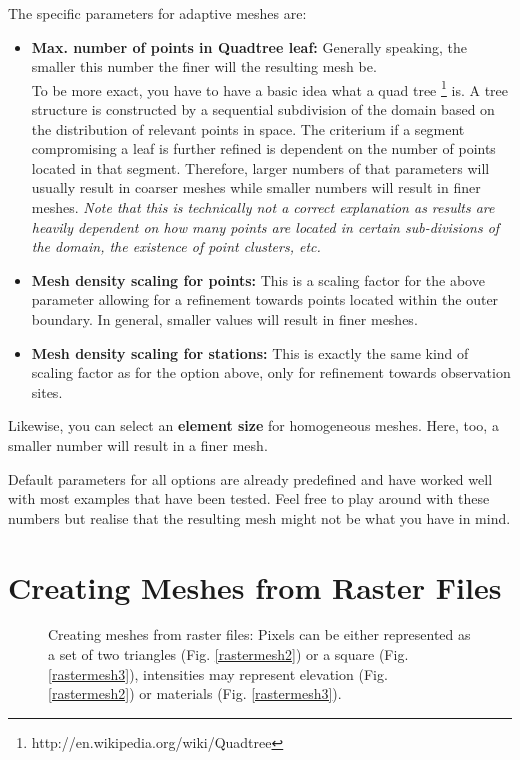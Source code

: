 The specific parameters for adaptive meshes are:
\begin{itemize}
\item \textbf{Max. number of points in Quadtree leaf:} Generally speaking, the smaller this number the finer will the resulting mesh be. \\
    To be more exact, you have to have a basic idea what a quad tree \footnote{http://en.wikipedia.org/wiki/Quadtree} is. A tree structure is constructed by a sequential subdivision of the domain based on the distribution of relevant points in space. The criterium if a segment compromising a leaf is further refined is dependent on the number of points located in that segment. Therefore, larger numbers of that parameters will usually result in coarser meshes while smaller numbers will result in finer meshes. \emph{Note that this is technically not a correct explanation as results are heavily dependent on how many points are located in certain sub-divisions of the domain, the existence of point clusters, etc.}
\item \textbf{Mesh density scaling for points:} This is a scaling factor for the above parameter allowing for a refinement towards points located within the outer boundary. In general, smaller values will result in finer meshes.
\item \textbf{Mesh density scaling for stations:} This is exactly the same kind of scaling factor as for the option above, only for refinement towards observation sites.
\end{itemize}

Likewise, you can select an \textbf{element size} for homogeneous meshes. Here, too, a smaller number will result in a finer mesh.

\bigskip

Default parameters for all options are already predefined and have worked well with most examples that have been tested. Feel free to play around with these numbers but realise that the resulting mesh might not be what you have in mind.

\section{Creating Meshes from Raster Files}
\label{meshraster}

\begin{figure}[tb]
\begin{center}
\enspace
{}\enspace
{}
\end{center}
\caption{Creating meshes from raster files: Pixels can be either represented as a set of two triangles (Fig. \ref{rastermesh2}) or a square (Fig. \ref{rastermesh3}), intensities may represent elevation (Fig. \ref{rastermesh2}) or materials (Fig. \ref{rastermesh3}).} 
\label{fig:rastermesh}
\end{figure}

